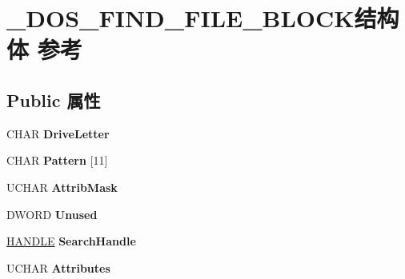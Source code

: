\hypertarget{struct___d_o_s___f_i_n_d___f_i_l_e___b_l_o_c_k}{}\section{\+\_\+\+D\+O\+S\+\_\+\+F\+I\+N\+D\+\_\+\+F\+I\+L\+E\+\_\+\+B\+L\+O\+C\+K结构体 参考}
\label{struct___d_o_s___f_i_n_d___f_i_l_e___b_l_o_c_k}
\subsection*{Public 属性}
\begin{DoxyCompactItemize}
\item 
\mbox{\label{struct___d_o_s___f_i_n_d___f_i_l_e___b_l_o_c_k_a961c978feacc19b7bfdefc0a756ad4be}} 
C\+H\+AR {\bfseries Drive\+Letter}
\item 
\mbox{\label{struct___d_o_s___f_i_n_d___f_i_l_e___b_l_o_c_k_ae40b71aa8efdd04debbe758ca94b2a8a}} 
C\+H\+AR {\bfseries Pattern} \mbox{[}11\mbox{]}
\item 
\mbox{\label{struct___d_o_s___f_i_n_d___f_i_l_e___b_l_o_c_k_a5ba862ce08a969632890104398a47527}} 
U\+C\+H\+AR {\bfseries Attrib\+Mask}
\item 
\mbox{\label{struct___d_o_s___f_i_n_d___f_i_l_e___b_l_o_c_k_adc5fc6325f9a721154e7c63f62931a6d}} 
D\+W\+O\+RD {\bfseries Unused}
\item 
\mbox{\label{struct___d_o_s___f_i_n_d___f_i_l_e___b_l_o_c_k_a03dec5eac7f7b6aa81f88224eeddd050}} 
\hyperlink{interfacevoid}{H\+A\+N\+D\+LE} {\bfseries Search\+Handle}
\item 
\mbox{\label{struct___d_o_s___f_i_n_d___f_i_l_e___b_l_o_c_k_adb00849fd10c353615e2fecf11ad8ace}} 
U\+C\+H\+AR {\bfseries Attributes}
\item 
\mbox{\label{struct___d_o_s___f_i_n_d___f_i_l_e___b_l_o_c_k_a6811c4958cb0d96d7ca923adad39fa4f}} 

\end{DoxyCompactItemize}
